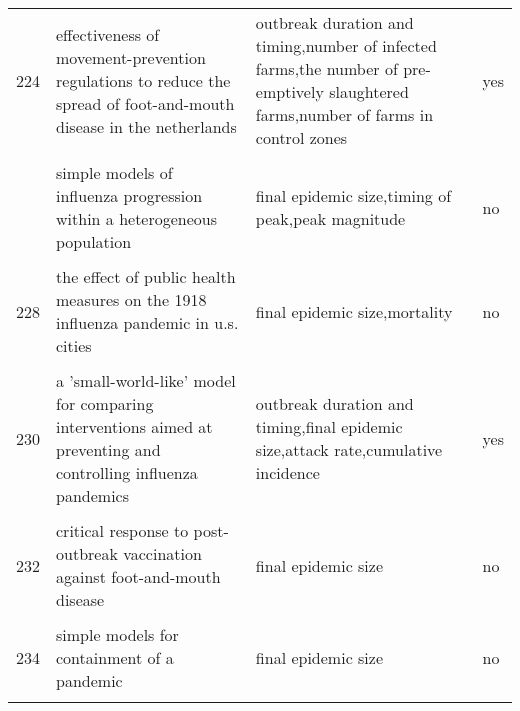 \documentclass[
]{article}
\begin{document}
\begin{landscape}
\begin{longtable}{l>{\raggedright\arraybackslash}p{4cm}>{\raggedright\arraybackslash}p{6cm}l}
224 & effectiveness of movement-prevention regulations to reduce the spread of foot-and-mouth disease in the netherlands & outbreak duration and timing,number of infected farms,the number of pre-emptively slaughtered farms,number of farms in control zones & yes\\
\cellcolor{gray!6}{225} & \cellcolor{gray!6}{effects of internal border control on spread of pandemic influenza} & \cellcolor{gray!6}{delay between epidemics} & \cellcolor{gray!6}{yes}\\
\addlinespace
226 & simple models of influenza progression within a heterogeneous population & final epidemic size,timing of peak,peak magnitude & no\\
\cellcolor{gray!6}{227} & \cellcolor{gray!6}{stochastic model of an influenza epidemic with drug resistance} & \cellcolor{gray!6}{final epidemic size,attack rate,resistant cases} & \cellcolor{gray!6}{no}\\
228 & the effect of public health measures on the 1918 influenza pandemic in u.s. cities & final epidemic size,mortality & no\\
\cellcolor{gray!6}{229} & \cellcolor{gray!6}{vaccinating in disease-free regions: a vaccine model with application to yellow fever} & \cellcolor{gray!6}{final epidemic size,r0,vaccination coverage} & \cellcolor{gray!6}{no}\\
230 & a 'small-world-like' model for comparing interventions aimed at preventing and controlling influenza pandemics & outbreak duration and timing,final epidemic size,attack rate,cumulative incidence & yes\\
\addlinespace
\cellcolor{gray!6}{231} & \cellcolor{gray!6}{containing pandemic influenza with antiviral agents: analytical commentary} & \cellcolor{gray!6}{attack rate} & \cellcolor{gray!6}{yes}\\
232 & critical response to post-outbreak vaccination against foot-and-mouth disease & final epidemic size & no\\
\cellcolor{gray!6}{233} & \cellcolor{gray!6}{mitigation strategies for pandemic influenza in the united states} & \cellcolor{gray!6}{attack rate,cumulative incidence} & \cellcolor{gray!6}{yes}\\
234 & simple models for containment of a pandemic & final epidemic size & no\\
\cellcolor{gray!6}{235} & \cellcolor{gray!6}{statistical inference in a stochastic epidemic seir model with control intervention: ebola as a case study} & \cellcolor{gray!6}{outbreak duration and timing,final epidemic size} & \cellcolor{gray!6}{no}\\

\end{longtable}
\end{landscape}
\end{document}
